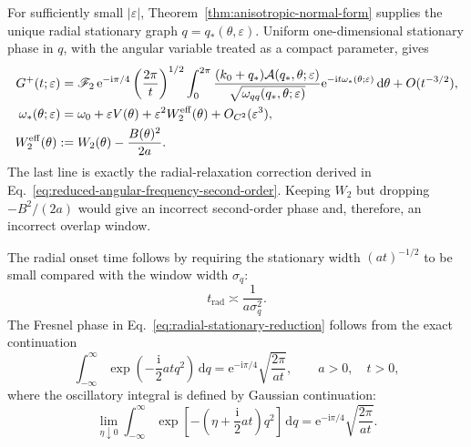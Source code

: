 For sufficiently small \(|\varepsilon|\),
Theorem~\ref{thm:anisotropic-normal-form} supplies the unique radial
stationary graph \(q=q_*(\theta,\varepsilon)\).  Uniform one-dimensional
stationary phase in \(q\), with the angular variable treated as a compact
parameter, gives
\begin{align}
  G^{+}(t;\varepsilon)
  ={}&\mathscr F_2\,
    \mathrm e^{-\mathrm i\pi/4}
    \left(\frac{2\pi}{t}\right)^{1/2}
    \int_0^{2\pi}
    \frac{(k_0+q_*)\mathcal A(q_*,\theta;\varepsilon)}
         {\sqrt{\omega_{qq}(q_*,\theta;\varepsilon)}}
    \mathrm e^{-\mathrm it\omega_*(\theta;\varepsilon)}
    \,\mathrm d\theta
    +O(t^{-3/2}),
  \label{eq:radial-stationary-reduction}\\
  \omega_*(\theta;\varepsilon)
  ={}&\omega_0+\varepsilon V(\theta)
    +\varepsilon^2W_2^{\mathrm{eff}}(\theta)
    +O_{C^2}(\varepsilon^3),                                      \notag\\
  W_2^{\mathrm{eff}}(\theta)
  :={}&W_2(\theta)-\frac{B(\theta)^2}{2a}.
  \label{eq:effective-second-order-green-phase}
\end{align}
The last line is exactly the radial-relaxation correction derived in
Eq.~\eqref{eq:reduced-angular-frequency-second-order}.  Keeping \(W_2\)
but dropping \(-B^2/(2a)\) would give an incorrect second-order phase and,
therefore, an incorrect overlap window.

The radial onset time follows by requiring the stationary width
\((at)^{-1/2}\) to be small compared with the window width \(\sigma_q\):
\begin{equation}
  t_{\mathrm{rad}}\asymp\frac{1}{a\sigma_q^2}.
  \label{eq:radial-stationary-onset-time}
\end{equation}
The Fresnel phase in Eq.~\eqref{eq:radial-stationary-reduction} follows from
the exact continuation
\begin{equation}
  \int_{-\infty}^{\infty}
    \exp\left(-\frac{\mathrm i}{2}atq^2\right)\,\mathrm dq
  =\mathrm e^{-\mathrm i\pi/4}
    \sqrt{\frac{2\pi}{at}},
  \qquad a>0,\quad t>0,
  \label{eq:radial-fresnel-factor}
\end{equation}
where the oscillatory integral is defined by Gaussian continuation:
\begin{equation}
  \lim_{\eta\downarrow0}
  \int_{-\infty}^{\infty}
    \exp\left[-\left(\eta+\frac{\mathrm i}{2}at\right)q^2\right]
    \,\mathrm dq
  =\mathrm e^{-\mathrm i\pi/4}\sqrt{\frac{2\pi}{at}}.
  \label{eq:regularized-radial-fresnel-factor}
\end{equation}

